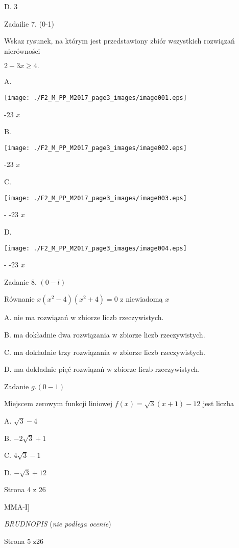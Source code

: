 \documentclass[a4paper,12pt]{article}
\begin{document}
D. 3

Zadailie 7. (0-1)

Wskaz rysunek, na którym jest przedstawiony zbiór wszystkich rozwiązań nierówności

$2-3x\geq 4.$

A.
\begin{center}
\texttt{[image: ./F2\_M\_PP\_M2017\_page3\_images/image001.eps]}
\end{center}
-23  {\it x}

B.
\begin{center}
\texttt{[image: ./F2\_M\_PP\_M2017\_page3\_images/image002.eps]}
\end{center}
-23  {\it x}

C.
\begin{center}
\texttt{[image: ./F2\_M\_PP\_M2017\_page3\_images/image003.eps]}
\end{center}
- -23  {\it x}

D.
\begin{center}
\texttt{[image: ./F2\_M\_PP\_M2017\_page3\_images/image004.eps]}
\end{center}
- -23  {\it x}

Zadanie 8. $(0-l)$

Równanie $x(x^{2}-4)(x^{2}+4)=0$ z niewiadomą $x$

A. nie ma rozwiązań w zbiorze liczb rzeczywistych.

B. ma dokładnie dwa rozwiązania w zbiorze liczb rzeczywistych.

C. ma dokładnie trzy rozwiązania w zbiorze liczb rzeczywistych.

D. ma dokładnie pięć rozwiązań w zbiorze liczb rzeczywistych.

Zadanie $g. (0-1)$

Miejscem zerowym funkcji liniowej $f(x)=\sqrt{3}(x+1)-12$ jest liczba

A. $\sqrt{3}-4$

B. $-2\sqrt{3}+1$

C. $4\sqrt{3}-1$

D. $-\sqrt{3}+12$

Strona 4 z 26

MMA-I]





{\it BRUDNOPIS} ({\it nie podlega ocenie})

Strona 5 z26
\end{document}
